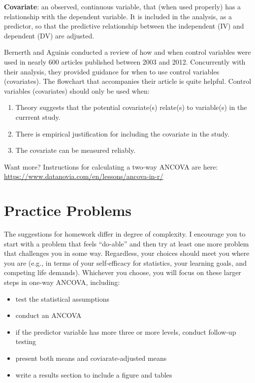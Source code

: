 \documentclass[
  11pt,
]{book}
\providecommand{\tightlist}{%
  \setlength{\itemsep}{0pt}\setlength{\parskip}{0pt}}
\begin{document}
\textbf{Covariate}: an observed, continuous variable, that (when used properly) has a relationship with the dependent variable. It is included in the analysis, as a predictor, so that the predictive relationship between the independent (IV) and dependent (DV) are adjusted.

Bernerth and Aguinis \citeyearpar{bernerth_critical_2016} conducted a review of how and when control variables were used in nearly 600 articles published between 2003 and 2012. Concurrently with their analysis, they provided guidance for when to use control variables (covariates). The flowchart that accompanies their article is quite helpful. Control variables (covariates) should only be used when:

\begin{enumerate}
\def\labelenumi{\arabic{enumi}.}
\tightlist
\item
  Theory suggests that the potential covariate(s) relate(s) to variable(s) in the currrent study.
\item
  There is empirical justification for including the covariate in the study.
\item
  The covariate can be measured reliably.
\end{enumerate}

Want more? Instructions for calculating a two-way ANCOVA are here: \url{https://www.datanovia.com/en/lessons/ancova-in-r/}

\hypertarget{practice-problems-9}{%
\section{Practice Problems}\label{practice-problems-9}}

The suggestions for homework differ in degree of complexity. I encourage you to start with a problem that feels ``do-able'' and then try at least one more problem that challenges you in some way. Regardless, your choices should meet you where you are (e.g., in terms of your self-efficacy for statistics, your learning goals, and competing life demands). Whichever you choose, you will focus on these larger steps in one-way ANCOVA, including:

\begin{itemize}
\tightlist
\item
  test the statistical assumptions
\item
  conduct an ANCOVA
\item
  if the predictor variable has more three or more levels, conduct follow-up testing
\item
  present both means and coviarate-adjusted means
\item
  write a results section to include a figure and tables
\end{itemize}
\end{document}
